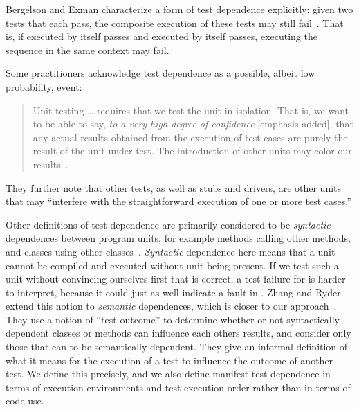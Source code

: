 Bergelson and Exman characterize a form of test dependence
explicitly: given two tests that each pass, the composite
execution of these tests may still
fail~\cite[p.~38]{bergelsonetal:EEE:2006}.  That is, if 
 executed by itself passes and  executed by itself passes,
executing the sequence  in the same context may fail.

Some practitioners acknowledge test dependence as a possible, albeit low probability, event:
\begin{quote}
Unit testing \dots  
requires that we test the unit in isolation. That is, we
want to be able to say, \emph{to a very high degree of confidence} [emphasis added], that
any actual results obtained from the execution of test cases are
purely the result of the unit under test. The introduction of
other units may color our results~\cite{unit-test-def}.
\end{quote}
They further note that other tests, as well as stubs and drivers, are
other units that may ``interfere with the straightforward
execution of one or more test cases.''

Other definitions of test dependence are primarily considered
to be \textit{syntactic} dependences between program units, for example
methods calling other methods, and classes using other classes~\cite{bergelsonetal:EEE:2006,briandetal:SEKE:2002}. 
\emph{Syntactic} dependence here means that a unit  cannot be
compiled and executed without unit  being present. If we test
such a unit  without convincing ourselves first that 
is correct, a test failure for  is harder to interpret,
because it could just as well indicate a fault in .
Zhang and Ryder extend this notion to \emph{semantic} dependences,
which is closer to our approach~\cite{zhangetal:TR:2006}. 
They use a notion of
``test outcome'' to determine whether or not syntactically dependent
classes or methods can influence each others results, and consider
only those that can to be semantically dependent.
They give an informal definition of what it means for the execution of a
test to influence the outcome of another test.  We define
this precisely, and we also define manifest test dependence in terms
of execution environments
and test execution order rather than in terms of code use.



